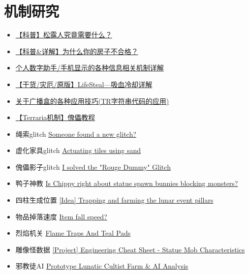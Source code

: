 \section{机制研究}
\begin{itemize}
\item \href{https://www.bbstr.net/threads/469/}{【科普】松露人究竟需要什么？}
\item \href{https://www.bbstr.net/threads/463/}{【科普\&详解】为什么你的房子不合格？} 
\item \href{https://www.bbstr.net/threads/133/}{个人数字助手/手机显示的各种信息相关机制详解}
\item \href{https://www.bbstr.net/threads/lifesteal.198/}{【干货/灾厄/原版】LifeSteal—吸血冷却详解}
\item \href{https://www.bbstr.net/threads/tr.127/}{关于广播盒的各种应用技巧(TR字符串代码的应用)}
\item \href{https://www.bilibili.com/read/cv2156999}{【Terraria机制】傀儡教程}
\item 绳索glitch \href{https://forums.terraria.org/index.php?threads/someone-found-a-new-glitch.75822/}{Someone found a new glitch?}
\item 虚化家具glitch \href{https://forums.terraria.org/index.php?threads/actuating-tiles-using-sand.75811/}{Actuating tiles using sand}
\item 傀儡影子glitch \href{https://forums.terraria.org/index.php?threads/i-solved-the-rouge-dummy-glitch.76951/}{I solved the "Rouge Dummy" Glitch}
\item 鸭子神教 \href{https://forums.terraria.org/index.php?threads/is-chippy-right-about-statue-spawn-bunnies-blocking-monsters.75819/}{Is Chippy right about statue spawn bunnies blocking monsters?}
\item 四柱生成位置 \href{https://forums.terraria.org/index.php?threads/idea-trapping-and-farming-the-lunar-event-pillars.75975/}{[Idea] Trapping and farming the lunar event pillars}
\item 物品掉落速度 \href{https://forums.terraria.org/index.php?threads/item-fall-speed.76050/}{Item fall speed?}
\item 烈焰机关 \href{https://forums.terraria.org/index.php?threads/flame-traps-and-teal-pads.76835/}{Flame Traps And Teal Pads}
\item 雕像怪数据 \href{https://forums.terraria.org/index.php?threads/project-engineering-cheat-sheet-statue-mob-characteristics.75881/}{[Project] Engineering Cheat Sheet - Statue Mob Characteristics}
\item 邪教徒AI \href{https://forums.terraria.org/index.php?threads/prototype-lunatic-cultist-farm-ai-analysis.77022/}{Prototype Lunatic Cultist Farm \& AI Analysis}
\end{itemize}

